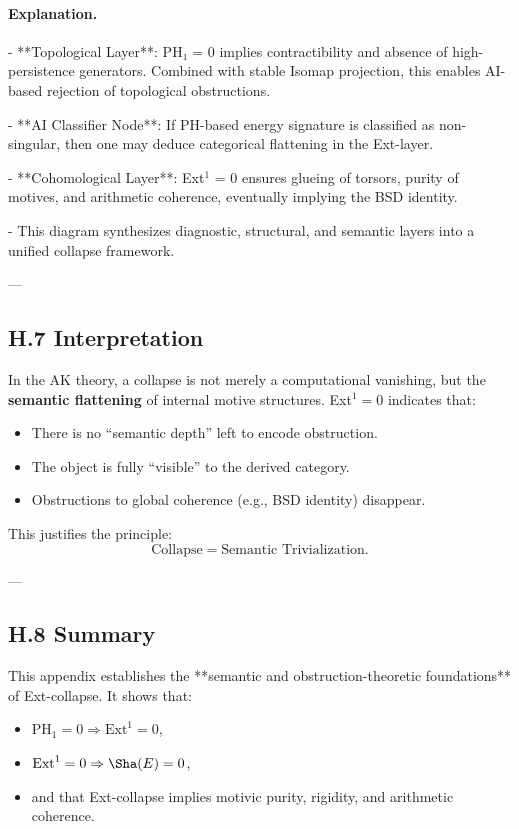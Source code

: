 \paragraph{Explanation.}

- **Topological Layer**: PH₁ = 0 implies contractibility and absence of high-persistence generators.  
  Combined with stable Isomap projection, this enables AI-based rejection of topological obstructions.

- **AI Classifier Node**: If PH-based energy signature is classified as non-singular, then one may deduce categorical flattening in the Ext-layer.

- **Cohomological Layer**: Ext$^1$ = 0 ensures glueing of torsors, purity of motives, and arithmetic coherence, eventually implying the BSD identity.

- This diagram synthesizes diagnostic, structural, and semantic layers into a unified collapse framework.

---

\subsection*{H.7 Interpretation}

In the AK theory, a collapse is not merely a computational vanishing,  
but the \textbf{semantic flattening} of internal motive structures.  
Ext$^1 = 0$ indicates that:

\begin{itemize}
  \item There is no “semantic depth” left to encode obstruction.
  \item The object is fully “visible” to the derived category.
  \item Obstructions to global coherence (e.g., BSD identity) disappear.
\end{itemize}

This justifies the principle:
\[
\text{Collapse} = \text{Semantic Trivialization}.
\]

---

\subsection*{H.8 Summary}

This appendix establishes the **semantic and obstruction-theoretic foundations** of Ext-collapse.  
It shows that:
\begin{itemize}
  \item \( \mathrm{PH}_1 = 0 \Rightarrow \mathrm{Ext}^1 = 0 \),
  \item \( \mathrm{Ext}^1 = 0 \Rightarrow \Sha(E) = 0 \),
  \item and that Ext-collapse implies motivic purity, rigidity, and arithmetic coherence.
\end{itemize}

